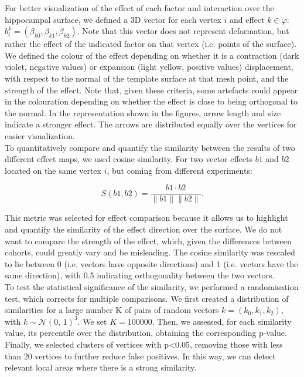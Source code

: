 For better visualization of the effect of each factor and interaction over the hippocampal surface, we defined a 3D vector for each vertex $i$ and effect $k \in \mathcal{\varphi}$: $b^k_{i} = (\beta_{k0}, \beta_{k1}, \beta_{k2}). $ Note that this vector does not represent deformation, but rather the effect of the indicated factor on that vertex (i.e. points of the surface). We defined the colour of the effect depending on whether it is a contraction (dark violet, negative values) or expansion (light yellow, positive values) displacement, with respect to the normal of the template surface at that mesh point, and the strength of the effect. Note that, given these criteria, some artefacts could appear in the colouration depending on whether the effect is close to being orthogonal to the normal. In the representation shown in the figures, arrow length and size indicate a stronger effect. The arrows are distributed equally over the vertices for easier visualization.  \\

To quantitatively compare and quantify the similarity between the results of two different effect maps, we used cosine similarity. For two vector effects $b1$ and $b2$ located on the same vertex $i$,  but coming from different experiments:

\begin{equation}
S(b1, b2) = \frac{b1\cdot b2}{\|b1\|\|b2\|}.
\end{equation}

This metric was selected for effect comparison because it allows us to highlight and quantify the similarity of the effect direction over the surface. We do not want to compare the strength of the effect, which, given the differences between cohorts, could greatly vary and be misleading. The cosine similarity was rescaled to lie between 0 (i.e. vectors have opposite directions) and 1 (i.e. vectors have the same direction), with 0.5 indicating orthogonality between the two vectors. \\

To test the statistical significance of the similarity, we performed a randomisation test, which corrects for multiple comparisons. We first created a distribution of similarities for a large number K of pairs of random vectors $k = (k_0, k_1, k_2)$, with $k \sim \mathcal{N}(0,\,1)^3$. We set $K=100000$. Then, we assessed, for each similarity value, its percentile over the distribution, obtaining the corresponding p-value. Finally, we selected clusters of vertices with p<0.05, removing those with less than 20 vertices to further reduce false positives. In this way, we can detect relevant local areas where there is a strong similarity. \\

